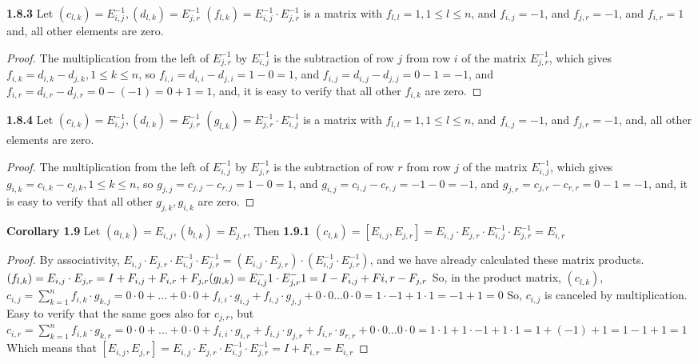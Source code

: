 \documentclass[12pt]{article}
\begin{document}
\textbf{1.8.3} 
Let $(c_{l,k})=E_{i,j}^{-1},(d_{l,k})=E_{j,r}^{-1}$ \newline
$(f_{l,k})=E_{i,j}^{-1} \cdot E_{j,r}^{-1}$ is a matrix with $f_{l,l}=1,1 \leq l \leq n$, and $f_{i,j}=-1$, and $f_{j,r}=-1$, and $f_{i,r}=1$ and, all other elements are zero.
\begin{proof}
The multiplication from the left of $E_{j,r}^{-1}$ by $E_{i,j}^{-1}$ is the subtraction of row $j$ from row $i$ of the matrix $E_{j,r}^{-1}$, which gives $f_{i,k}=d_{i,k}-d_{j,k},1 \leq k \leq n$, so $f_{i,i}=d_{i,i}-d_{j,i}=1-0=1$, and $f_{i,j}=d_{i,j}-d_{j,j}=0-1=-1$, and $f_{i,r}=d_{i,r}-d_{j,r}=0-(-1)=0+1=1$, and, it is easy to verify that all other $f_{i,k}$ are zero. 
\end{proof}
\textbf{1.8.4} 
Let $(c_{l,k})=E_{i,j}^{-1},(d_{l,k})=E_{j,r}^{-1}$ \newline
$(g_{l,k})=E_{j,r}^{-1} \cdot E_{i,j}^{-1}$ is a matrix with $f_{l,l}=1,1 \leq l \leq n$, and $f_{i,j}=-1$, and $f_{j,r}=-1$, and, all other elements are zero.
\begin{proof}
The multiplication from the left of $E_{i,j}^{-1}$ by $E_{j,r}^{-1}$ is the subtraction of row $r$ from row $j$ of the matrix $E_{i,j}^{-1}$, which gives $g_{i,k}=c_{i,k}-c_{j,k},1 \leq k \leq n$, so $g_{j,j}=c_{j,j}-c_{r,j}=1-0=1$, and $g_{i,j}=c_{i,j}-c_{r,j}=-1-0=-1$, and $g_{j,r}=c_{j,r}-c_{r,r}=0-1=-1$, and, it is easy to verify that all other $g_{j,k},g_{i,k}$ are zero. 
\end{proof}
\textbf{Corollary 1.9} 
Let $(a_{l,k})=E_{i,j},(b_{l,k})=E_{j,r}$, Then\newline
\textbf{1.9.1}
$(c_{l,k})=[E_{i,j},E_{j,r}]= E_{i,j} \cdot E_{j,r} \cdot E_{i,j}^{-1} \cdot E_{j,r}^{-1}=E_{i,r}$
\begin{proof}
By associativity, $E_{i,j} \cdot E_{j,r} \cdot E_{i,j}^{-1} \cdot E_{j,r}^{-1}=(E_{i,j} \cdot E_{j,r}) \cdot (E_{i,j}^{-1} \cdot E_{j,r}^{-1})$, and we have already calculated these matrix products. \newline
$(f_{l,k})=E_{i,j} \cdot E_{j,r}=I+F_{i,j}+F_{i,r}+F_{j,r} \newline
(g_{l,k})=E_{i,j}^-1 \cdot E_{j,r}^-1=I-F_{i,j}+F{i,r}-F_{j,r}$ \newline
So, in the product matrix, $(c_{l,k})$, $c_{i,j}=\sum_{k=1}^n f_{i,k} \cdot g_{k,j}=0 \cdot 0+ \dots +0 \cdot 0+f_{i,i} \cdot g_{i,j}+f_{i,j} \cdot g_{j,j}+0 \cdot 0 \dots 0 \cdot 0=1 \cdot -1+1 \cdot 1=-1+1=0$ \newline
So, $c_{i,j}$ is canceled by multiplication. Easy to verify that the same goes also for $c_{j,r}$, but $c_{i,r}=\sum_{k=1}^n f_{i,k} \cdot g_{k,r}=0 \cdot 0+ \dots +0 \cdot 0+f_{i,i} \cdot g_{i,r}+f_{i,j} \cdot g_{j,r}+f_{i,r} \cdot g_{r,r}+0 \cdot 0 \dots 0 \cdot 0=1 \cdot 1+1 \cdot -1+1 \cdot 1=1+(-1)+1=1-1+1=1$ \newline
Which means that $[E_{i,j},E_{j,r}]= E_{i,j} \cdot E_{j,r} \cdot E_{i,j}^{-1} \cdot E_{j,r}^{-1}=I+F_{i,r}=E_{i,r}$
\end{proof}
\end{document}
